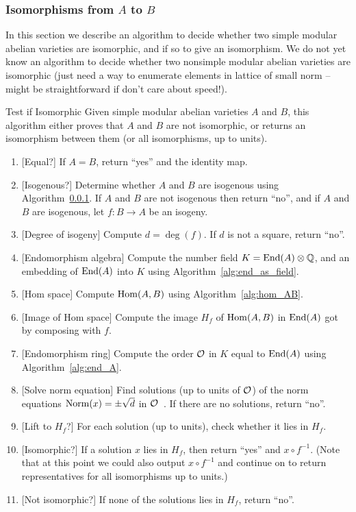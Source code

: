 \documentclass{article}
\begin{document}
\subsubsection{Isomorphisms from $A$ to $B$}

In this section we describe an algorithm to decide whether two simple
modular abelian varieties are isomorphic, and if so to give an
isomorphism.  We do not yet know an algorithm to decide whether two
nonsimple modular abelian varieties are isomorphic (just need a way
to enumerate elements in lattice of small norm -- might be straightforward
if don't care about speed!).


\begin{algorithm}{Test if Isomorphic}\label{alg:isom}
    Given simple modular abelian varieties $A$ and $B$,
    this algorithm either proves that $A$ and $B$ are not isomorphic,
    or returns an isomorphism between them (or all isomorphisms,
    up to units).

    \begin{enumerate}
        \item{}[Equal?] If $A=B$, return ``yes'' and the identity map.
        \item{}[Isogenous?]  Determine whether $A$ and $B$ are isogenous using Algorithm~\ref{}.
            If $A$ and $B$ are not isogenous then return ``no'', and if
            $A$ and $B$ are isogenous, let $f: B \to A$ be an isogeny.
        \item{}[Degree of isogeny]  Compute $d = \deg(f)$. If $d$ is not a square, return ``no''.
        \item{}[Endomorphism algebra]
            Compute the number field $K=\operatorname{End}(A)\otimes\mathbb{Q}$, and
            an embedding of $\operatorname{End}(A)$ into $K$ using
            Algorithm~\ref{alg:end_as_field}.
        \item{}[Hom space] Compute $\operatorname{Hom}(A,B)$ using Algorithm~\ref{alg:hom_AB}.
        \item{}[Image of Hom space]  Compute the image $H_f$ of $\operatorname{Hom}(A,B)$ in $\operatorname{End}(A)$
            got by composing with $f$.
        \item{}[Endomorphism ring] Compute the order $\mathcal{O}$ in $K$ equal to $\operatorname{End}(A)$
            using Algorithm~\ref{alg:end_A}.
        \item{}[Solve norm equation] Find solutions (up to units of $\mathcal{O}$) of the norm equations
            $\operatorname{Norm}(x) = \pm \sqrt{d}$ in $\mathcal{O}$~\cite{TODO}. If there are no solutions, return ``no''.
        \item{}[Lift to $H_f$?]   For each solution (up to units), check whether it lies in $H_f$.
        \item{}[Isomorphic?]   If a solution $x$ lies in $H_f$, then return ``yes'' and $x\circ f^{-1}$.
            (Note that at this point we could also output $x\circ f^{-1}$ and continue
            on to return representatives for all isomorphisms up to units.)

        \item{}[Not isomorphic?]   If none of the solutions lies in $H_f$, return ``no''.
    \end{enumerate}
\end{algorithm}
\end{document}
